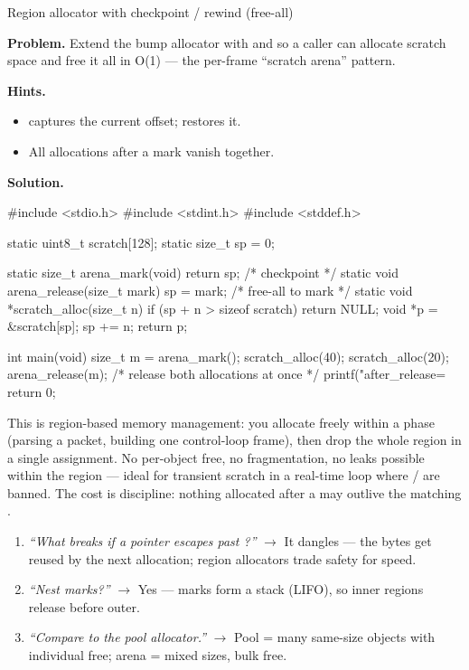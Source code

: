\begin{gymproblem}{Region allocator with checkpoint / rewind (free-all)}

\textbf{Problem.} Extend the bump allocator with  and
 so a caller can allocate scratch space and free it all in O(1)
--- the per-frame ``scratch arena'' pattern.

\textbf{Hints.}
\begin{itemize}
\item {} captures the current offset;  restores it.
\item All allocations after a mark vanish together.
\end{itemize}

\attempt

\textbf{Solution.}
\begin{cgym}
#include <stdio.h>
#include <stdint.h>
#include <stddef.h>

static uint8_t scratch[128];
static size_t  sp = 0;

static size_t arena_mark(void)            { return sp; }     /* checkpoint */
static void   arena_release(size_t mark)  { sp = mark; }     /* free-all to mark */
static void  *scratch_alloc(size_t n) {
    if (sp + n > sizeof scratch) return NULL;
    void *p = &scratch[sp];
    sp += n;
    return p;
}

int main(void) {
    size_t m = arena_mark();
    scratch_alloc(40);
    scratch_alloc(20);
    arena_release(m);                     /* release both allocations at once */
    printf("after_release=%
    return 0;
}
\end{cgym}

This is region-based memory management: you allocate freely within a phase
(parsing a packet, building one control-loop frame), then drop the whole region
in a single assignment. No per-object free, no fragmentation, no leaks possible
within the region --- ideal for transient scratch in a real-time loop where
/ are banned. The cost is discipline: nothing allocated
after a  may outlive the matching .

\followups
\begin{enumerate}
\item \emph{``What breaks if a pointer escapes past ?''}
  $\rightarrow$ It dangles --- the bytes get reused by the next allocation;
  region allocators trade safety for speed.
\item \emph{``Nest marks?''} $\rightarrow$ Yes --- marks form a stack
  (LIFO), so inner regions release before outer.
\item \emph{``Compare to the pool allocator.''} $\rightarrow$ Pool = many
  same-size objects with individual free; arena = mixed sizes, bulk free.
\end{enumerate}
\end{gymproblem}

